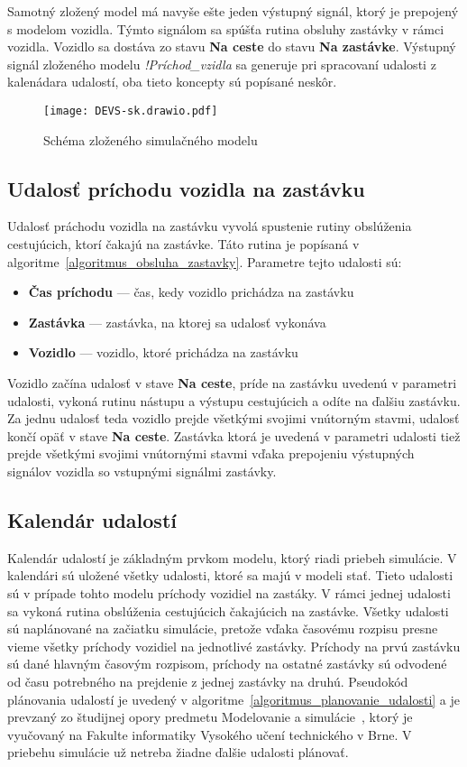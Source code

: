 Samotný zložený model má navyše ešte jeden výstupný signál, ktorý je prepojený s modelom vozidla.
Týmto signálom sa spúšťa rutina obsluhy zastávky v rámci vozidla.
Vozidlo sa dostáva zo stavu \textbf{Na ceste} do stavu \textbf{Na zastávke}.
Výstupný signál zloženého modelu \textit{!Príchod\_vzidla} sa generuje pri spracovaní udalosti z kalenádara udalostí, oba tieto koncepty sú popísané neskôr.

\begin{figure}[h]\label{fig:simulacny_model}
  \centering
  \texttt{[image: DEVS-sk.drawio.pdf]}
  \caption{Schéma zloženého simulačného modelu}
\end{figure}

\subsection*{Udalosť príchodu vozidla na zastávku}
Udalosť práchodu vozidla na zastávku vyvolá spustenie rutiny obslúženia cestujúcich, ktorí čakajú na zastávke. Táto rutina je popísaná v algoritme~\ref{algoritmus_obsluha_zastavky}.
Parametre tejto udalosti sú:
\begin{itemize}
  \item \textbf{Čas príchodu} --- čas, kedy vozidlo prichádza na zastávku
  \item \textbf{Zastávka} --- zastávka, na ktorej sa udalosť vykonáva
  \item \textbf{Vozidlo} --- vozidlo, ktoré prichádza na zastávku
\end{itemize}

Vozidlo začína udalosť v stave \textbf{Na ceste}, príde na zastávku uvedenú v parametri udalosti, vykoná rutinu nástupu a výstupu cestujúcich a odíte na ďalšiu zastávku.
Za jednu udalosť teda vozidlo prejde všetkými svojimi vnútorným stavmi, udalosť končí opäť v stave \textbf{Na ceste}.
Zastávka ktorá je uvedená v parametri udalosti tiež prejde všetkými svojimi vnútornými stavmi vďaka prepojeniu výstupných signálov vozidla so vstupnými signálmi zastávky.

\subsection*{Kalendár udalostí}
Kalendár udalostí je základným prvkom modelu, ktorý riadi priebeh simulácie.
V kalendári sú uložené všetky udalosti, ktoré sa majú v modeli stať.
Tieto udalosti sú v prípade tohto modelu príchody vozidiel na zastáky.
V rámci jednej udalosti sa vykoná rutina obslúženia cestujúcich čakajúcich na zastávke.
Všetky udalosti sú naplánované na začiatku simulácie, pretože vďaka časovému rozpisu presne vieme všetky príchody vozidiel na jednotlivé zastávky.
Príchody na prvú zastávku sú dané hlavným časovým rozpisom, príchody na ostatné zastávky sú odvodené od času potrebného na prejdenie z jednej zastávky na druhú.
Pseudokód plánovania udalostí je uvedený v algoritme~\ref{algoritmus_planovanie_udalosti} a je prevzaný zo študijnej opory predmetu Modelovanie a simulácie~\cite{peringer2022ims}, ktorý je vyučovaný na Fakulte informatiky Vysokého učení technického v Brne.
V priebehu simulácie už netreba žiadne ďalšie udalosti plánovať.

